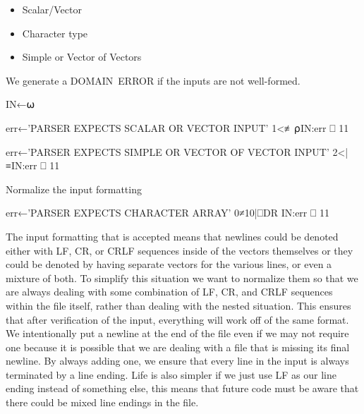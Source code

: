 \documentclass{article}%
\begin{document}
\begin{itemize}
        \item Scalar/Vector
        \item Character type
        \item Simple or Vector of Vectors
\end{itemize}

\noindent
We generate a {\Tt{}DOMAIN\ ERROR\nwendquote} if the inputs are not well-formed.

\nwenddocs{}\endmoddef\nwstartdeflinemarkup{}\nwenddeflinemarkup
IN←⍵

err←'PARSER EXPECTS SCALAR OR VECTOR INPUT'
1<≢⍴IN:err ⎕ 11

err←'PARSER EXPECTS SIMPLE OR VECTOR OF VECTOR INPUT'
2<|≡IN:err ⎕ 11

\LA{}Normalize the input formatting~{\nwtagstyle{}}\RA{}

err←'PARSER EXPECTS CHARACTER ARRAY'
0≠10|⎕DR IN:err ⎕ 11
\nwendcode{}\nwdocspar

The input formatting that is accepted means that newlines could be
denoted either with {\Tt{}LF\nwendquote}, {\Tt{}CR\nwendquote}, or {\Tt{}CRLF\nwendquote}
sequences inside of the vectors
themselves or they could be denoted by having separate vectors
for the various lines,
or even a mixture of both.
To simplify this situation we want to normalize them so that we are
always dealing with some combination of {\Tt{}LF\nwendquote}, {\Tt{}CR\nwendquote}, and {\Tt{}CRLF\nwendquote}
sequences
within the file itself, rather than dealing with the nested
situation.
This ensures that after verification of the input,
everything will work off of the same format.
We intentionally put a newline at the end of the file even if we
may not require one because it is possible that we are dealing
with a file that is missing its final newline.
By always adding one, we ensure that every line in the input
is always terminated by a line ending.
Life is also simpler if we just use LF as our line ending instead
of something else,
this means that future code must be aware that there could be mixed
line endings in the file.
\end{document}
